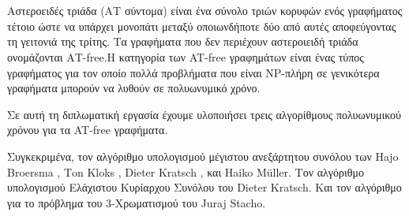 \chapter*{\abstractname}
\addstarredchapter{\abstractname} %
\makecseabstract


\noindent Αστεροειδές τριάδα (ΑΤ σύντομα) είναι ένα σύνολο τριών κορυφών ενός γραφήματος τέτοιο ώστε να υπάρχει μονοπάτι μεταξύ οποιωνδήποτε δύο από αυτές αποφεύγοντας τη γειτονιά της τρίτης. Τα γραφήματα που δεν περιέχουν αστεροιειδή τριάδα ονομάζονται ΑT-free.Η κατηγορία των AT-free γραφημάτων είναι ένας τύπος γραφήματος για τον οποίο πολλά προβλήματα που είναι NP-πλήρη σε γενικότερα γραφήματα μπορούν να λυθούν σε πολυωνυμικό χρόνο.

Σε αυτή τη διπλωματική εργασία έχουμε υλοποιήσει τρεις αλγορίθμους πολυωνυμικού χρόνου για τα AT-free γραφήματα.

Συγκεκριμένα, τον αλγόριθμο υπολογισμού μέγιστου ανεξάρτητου συνόλου των Ηajo Βroersma , Τon Κloks , Dieter Kratsch , 
και Ηaiko Μüller\cite{at-free-independent-sets}. Τον αλγόριθμο υπολογισμού Ελάχιστου Κυρίαρχου Συνόλου του Dieter Kratsch\cite{at-free-domination}. 
Και τον αλγόριθμο για το πρόβλημα του 3-Χρωματισμού του Juraj Stacho\cite{at-free-3-colouring}. 
